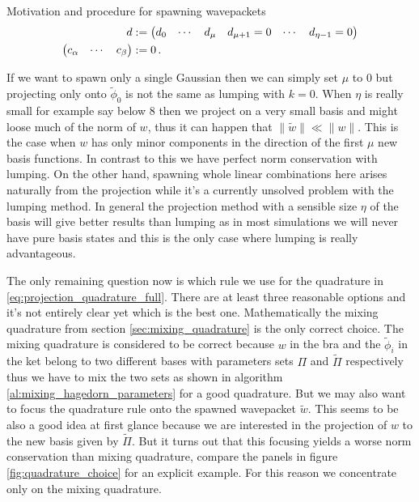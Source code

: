 \begin{chapter}{Motivation and procedure for spawning wavepackets}
\begin{equation}
\begin{split}
  d & :=
  \begin{pmatrix}
    d_0 & \cdots & d_{\mu} & d_{\mu+1} = 0 & \cdots & d_{\eta-1} = 0
  \end{pmatrix} \\
  \begin{pmatrix}
    c_\alpha & \cdots & c_\beta
  \end{pmatrix} & := 0 \,.
\end{split}
\end{equation}

If we want to spawn only a single Gaussian then we can simply set $\mu$ to $0$
but projecting only onto $\tilde{\phi}_0$ is not the same as lumping with $k=0$.
When $\eta$ is really small for example say below 8 then we project on a very
small basis and might loose much of the norm of $w$, thus it can happen that
$\|\tilde{w}\| \ll \|w\|$. This is the case when $w$ has only minor components
in the direction of the first $\mu$ new basis functions. In contrast to this we
have perfect norm conservation with lumping. On the other hand, spawning whole
linear combinations here arises naturally from the projection while it's a currently
unsolved problem with the lumping method. In general the projection method with
a sensible size $\eta$ of the basis will give better results than lumping as
in most simulations we will never have pure basis states and this is the only
case where lumping is really advantageous.

The only remaining question now is which rule we use for the quadrature in
\eqref{eq:projection_quadrature_full}. There are at least three reasonable options
and it's not entirely clear yet which is the best one. Mathematically the
mixing quadrature from section \ref{sec:mixing_quadrature} is the only correct choice.
The mixing quadrature is considered to be correct because $w$ in the bra and the $\tilde{\phi}_i$
in the ket belong to two different bases with parameters sets $\Pi$ and $\tilde{\Pi}$
respectively thus we have to mix the two sets as shown in algorithm \ref{al:mixing_hagedorn_parameters}
for a good quadrature. But we may also want to focus the quadrature rule onto
the spawned wavepacket $\tilde{w}$. This seems to be also a good idea at first
glance because we are interested in the projection of $w$ to the new basis given
by $\tilde{\Pi}$. But it turns out that this focusing yields a worse norm
conservation than mixing quadrature, compare the panels in figure \ref{fig:quadrature_choice}
for an explicit example. For this reason we concentrate only on the mixing quadrature.


\end{chapter}
